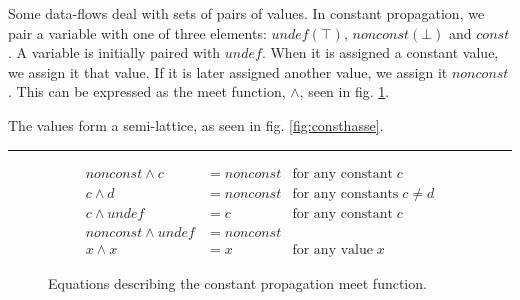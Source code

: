 \documentclass[bsc,twoside,singlespacing,parskip,logo,notimes,normalheadings]{infthesis}
\begin{document}
        Some data-flows deal with sets of pairs of values. In constant
        propagation, we pair a variable with one of three elements:
        $undef (\top)$, $nonconst (\bot)$ and $const$. A variable is
        initially paired with $undef$. When it is assigned a constant
        value, we assign it that value. If it is later assigned
        another value, we assign it $nonconst$. This can be expressed
        as the meet function, $\land$, seen in fig. \ref{fig:constmeet}.
        
        The values form a semi-lattice, as seen in
        fig. \ref{fig:consthasse}.

        \rule{\textwidth}{0.1mm}

        \begin{figure}[h]
        \begin{align*}
        nonconst \land c     & = nonconst & \text{for any constant} \; c         \\
        c \land d            & = nonconst & \text{for any constants} \; c \neq d \\
        c \land undef        & = c        & \text{for any constant} \; c         \\
        nonconst \land undef & = nonconst &                                      \\
        x \land x            & = x        & \text{for any value} \; x
        \end{align*}
        \caption{Equations describing the constant propagation meet function.}
        \label{fig:constmeet}
        \end{figure}
        
\end{document}
